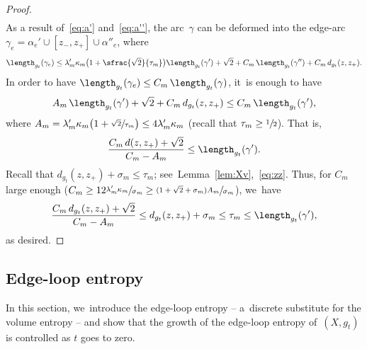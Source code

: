 \begin{proof}
\begin{equation}
\begin{aligned}
\end{aligned}
\end{equation}
As a result of~\eqref{eq:a'} and~\eqref{eq:a''}, the arc~$\gamma$ can be deformed into the edge-arc $\gamma_e = \alpha_e' \cup [z_-,z_+] \cup \alpha''_e$, where
\[
\length_{g_t}(\gamma_e) \leq \lambda'_m \kappa_m \bigl(1 + \sfrac{\sqrt{2}}{\tau_m} \bigr) \length_{g_t}(\gamma') + \sqrt{2} + C_m \, \length_{g_t}(\gamma'') + C_m \, d_{g_t}(z,z_+).
\]
In order to have $\length_{g_t}(\gamma_e) \leq C_m \, \length_{g_t}(\gamma)$, it~is enough to have
\[
A_m \, \length_{g_t}(\gamma') + \sqrt{2} + C_m \, d_{g_t}(z,z_+) \leq C_m \, \length_{g_t}(\gamma'),
\]
where $A_m = \lambda'_m \kappa_m \bigl(1 + \sfrac{\sqrt{2}}{\tau_m}\bigr) \leq 4 \lambda'_m \kappa_m$ (recall that $\tau_m \geq \sfrac{1}{2}$).
That is,
\[
\frac{C_m \, d(z,z_+) + \sqrt{2}}{C_m - A_m} \leq \length_{g_t}(\gamma').
\]
Recall that $d_{g_t}(z,z_+) + \sigma_m \leq \tau_m$; see~Lemma~\ref{lem:Xv},~\eqref{eq:zz}.
Thus, for $C_m$ large enough (\eg $C_m \geq 12 \sfrac{\lambda'_m \kappa_m}{\sigma_m} \geq \sfrac{(1+ \sqrt{2} +\sigma_m) A_m}{\sigma_m}$), we~have
\[
\frac{C_m \, d_{g_t}(z,z_+) + \sqrt{2}}{C_m - A_m} \leq d_{g_t}(z,z_+) + \sigma_m \leq \tau_m \leq \length_{g_t}(\gamma'),
\]
as desired.
\end{proof}

\subsection{Edge-loop entropy} \label{sec:edge-loop}

In this section, we~introduce the edge-loop entropy -- a~discrete substitute for the volume entropy -- and show that the growth of the edge-loop entropy of~$(X,g_t)$ is controlled as $t$ goes to zero.

